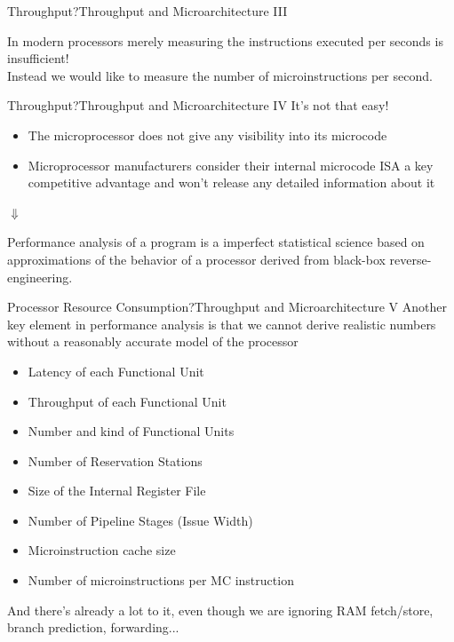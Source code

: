 \begin{frame}{Throughput?}{Throughput and Microarchitecture III}
\begin{center}
In modern processors merely measuring the instructions executed per seconds is \alert{insufficient}!\\
\bigskip
Instead we would like to measure the number of \alert{microinstructions} per second.
\end{center}
\end{frame}


\begin{frame}{Throughput?}{Throughput and Microarchitecture IV}
It's not that easy!
\begin{itemize}
\item The microprocessor does not give any visibility into its microcode
\item Microprocessor manufacturers consider their internal microcode ISA a \alert{key competitive advantage} and won't release any detailed information about it
\end{itemize}
\bigskip
\begin{centering}
$\Downarrow$\\
\end{centering}
\bigskip
Performance analysis of a program is a \alert{imperfect statistical science} based on \alert{approximations} of the behavior of a processor derived from \alert{black-box reverse-engineering}.
\end{frame}


\begin{frame}{Processor Resource Consumption?}{Throughput and Microarchitecture V}
Another key element in performance analysis is that \alert{we cannot derive realistic numbers without a reasonably accurate model of the processor}

\begin{itemize}
\item Latency of each Functional Unit
\item Throughput of each Functional Unit
\item Number and kind of Functional Units
\item Number of Reservation Stations
\item Size of the Internal Register File
\item Number of Pipeline Stages (Issue Width)
\item Microinstruction cache size
\item Number of microinstructions per MC instruction
\end{itemize}

{\footnotesize And there's already a lot to it, even though we are ignoring RAM fetch/store, branch prediction, forwarding...}
\end{frame}


